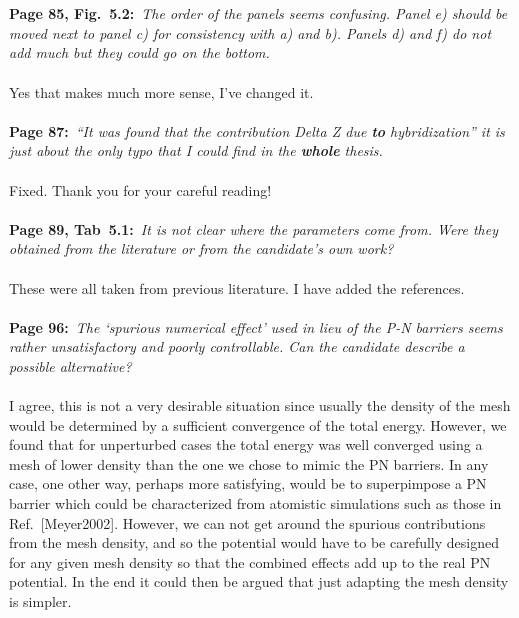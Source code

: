 \documentclass[a4, UTF8]{article}
\begin{document}
\\\\
{\bf Page 85, Fig.~5.2:}~{\it The order of the panels seems confusing. Panel e) should be moved next to
panel c) for consistency with a) and b). Panels d) and f) do not add much but they could go on the
bottom.}
\\\\
Yes that makes much more sense, I've changed it.
\\\\
{\bf Page 87:}~{\it ``It was found that the contribution Delta Z due {\bf to} hybridization'' it is just about the only typo that I could find in the {\bf whole} thesis.}
\\\\
Fixed. Thank you for your careful reading!
\\\\
{\bf Page 89, Tab~5.1:}~{\it It is not clear where the parameters come from. Were they obtained from the literature or from the candidate’s own work?}
\\\\
These were all taken from previous literature. I have added the references.
\\\\
{\bf Page 96:}~{\it The `spurious numerical effect' used in lieu of the P-N barriers seems rather
unsatisfactory and poorly controllable. Can the candidate describe a possible alternative?}
\\\\
I agree, this is not a very desirable situation since usually the density of the mesh would be determined by a sufficient convergence of the total energy. However, we found that for unperturbed cases the total energy was well converged using a mesh of lower density than the one we chose to mimic the PN barriers.
In any case, one other way, perhaps more satisfying, would be to superpimpose a PN barrier which could be characterized from atomistic simulations such as those in Ref.~[Meyer2002]. However, we can not get around the spurious contributions from the mesh density, and so the potential would have to be carefully designed for any given mesh density so that the combined effects add up to the real PN potential. In the end it could then be argued that just adapting the mesh density is simpler.
\end{document}

